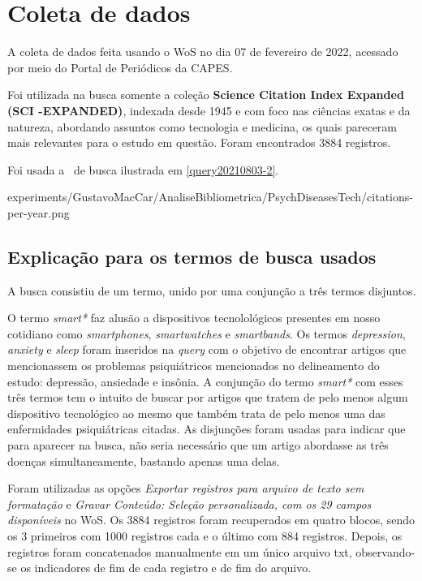 \section{Coleta de dados}

A coleta de dados feita usando o WoS no dia 07 de fevereiro de 2022, acessado por meio do Portal de Periódicos da CAPES.

Foi utilizada na busca somente a coleção \textbf{Science  Citation  Index  Expanded (SCI -EXPANDED)}, indexada desde 1945 e com foco nas ciências exatas e da natureza, abordando assuntos como tecnologia e medicina, 
os quais pareceram mais relevantes para o estudo em questão. Foram encontrados 3884 registros.

Foi usada a \query\  de busca ilustrada em \ref{query20210803-2}.


{experiments/GustavoMacCar/AnaliseBibliometrica/PsychDiseasesTech/citations-per-year.png}

\subsection{Explicação para os termos de busca usados}

A busca consistiu de um termo, unido por uma conjunção a três termos disjuntos.

O termo \textit{smart*} faz alusão a dispositivos tecnolológicos presentes em nosso cotidiano como \textit{smartphones}, \textit{smartwatches} e \textit{smartbands}. Os termos \textit{depression}, \textit{anxiety} e \textit{sleep} foram 
inseridos na \textit{query} com o objetivo de encontrar artigos que mencionassem os problemas psiquiátricos mencionados no delineamento do estudo: depressão, ansiedade e insônia. A conjunção do termo \textit{smart*} com esses três termos tem o 
intuito de buscar por artigos que tratem de pelo menos algum dispositivo tecnológico ao mesmo que também trata de pelo menos uma das enfermidades psiquiátricas citadas. As disjunções foram usadas para indicar que para aparecer na busca, não seria 
necessário que um artigo abordasse as três doenças simultaneamente, bastando apenas uma delas.

Foram utilizadas as opções \textit{Exportar registros para arquivo de texto sem formatação} e \textit{Gravar Conteúdo: Seleção personalizada, com os 29 campos disponíveis} no WoS. Os 3884 registros foram recuperados em quatro blocos, sendo os 3 primeiros com 1000 registros cada e o 
último com 884 registros. Depois, os registros foram concatenados manualmente em um único arquivo txt, observando-se os indicadores de fim de cada registro e de fim do arquivo. 

